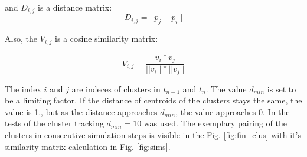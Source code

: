 and $ D_{i,j} $ is a distance matrix:
 \begin{equation}D_{i,j} = || p_j - p_i ||\end{equation}

Also, the $V_{i,j}$ is a cosine similarity matrix:

\begin{equation}
V_{i,j} = \frac{v_i*v_j}{\lvert\lvert v_i \rvert\rvert*\lvert\lvert v_j \rvert\rvert}
\end{equation}

The index $i$ and $j$ are indeces of clusters in $t_{n-1}$ and $t_{n}$.
The value $d_{min}$ is set to be a limiting factor. If the distance of centroids of the clusters stays the same, the value is 1., but as the distance approaches $d_{min}$, the value approaches 0.
In the tests of the cluster tracking $d_{min}=10$ was used.
The exemplary pairing of the clusters in consecutive simulation steps is visible in the Fig. \ref{fig:fin_clus} with it's similarity matrix calculation in Fig. \ref{fig:sims}.

